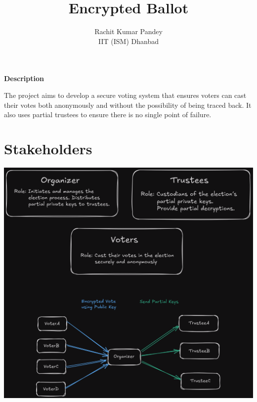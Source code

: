 \documentclass{article}
\title{\textbf{Encrypted Ballot}}
\author{Rachit Kumar Pandey \\ IIT (ISM) Dhanbad}
\date{}
\renewenvironment{abstract}{
    \begin{center}
        \textbf{Description} %
    \end{center}
    \noindent
}{
    \par\vspace{0em}
}
\begin{document}
\maketitle

\begin{abstract}
The project aims to develop a secure voting system that ensures voters can cast their votes both anonymously and without the possibility of being traced back. It also uses partial trustees to ensure there is no single point of failure.
\end{abstract}
\section*{\centering Stakeholders}
\begin{center}
    \includegraphics[width=\textwidth]{stakeholders.png}
\end{center}
\begin{centering}
    
\end{centering}
\pagebreak
\end{document}
